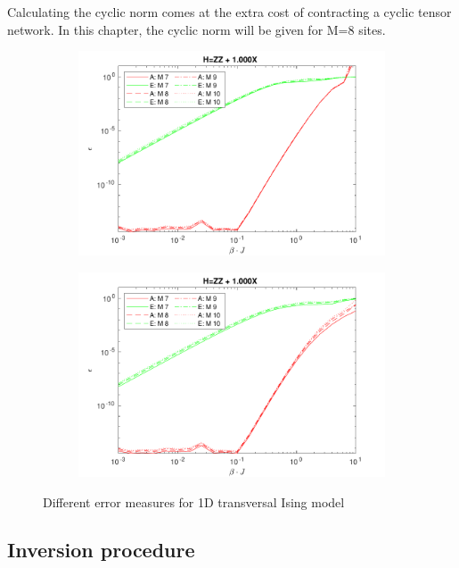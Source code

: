 Calculating the cyclic norm comes at the extra cost of contracting a cyclic tensor network. In this chapter, the cyclic norm will be given for M=8 sites.

\begin{figure}
  \begin{subfigure}[]{\linewidth}
    \includegraphics[width=\textwidth]{Figuren/benchmarking/comp_M_cycl.pdf}
  \end{subfigure}
  \begin{subfigure}[]{\linewidth}
    \includegraphics[width=\textwidth]{Figuren/benchmarking/Comp_M_lin.pdf}
  \end{subfigure}
  \caption{ Different error measures for 1D transversal Ising model }
  \label{benchmarking:systemsize}
\end{figure}

\subsection{Inversion procedure}

